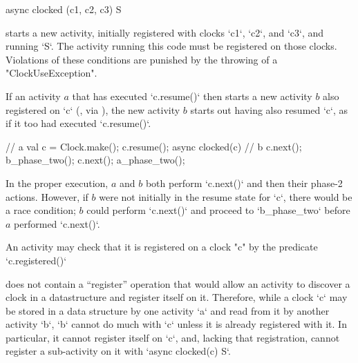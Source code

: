 \begin{xten}
  async clocked (c1, c2, c3) S
\end{xten}
starts a new activity, initially registered with
clocks \xcd`c1`, \xcd`c2`, and \xcd`c3`, and  running \xcd`S`. The activity running this code must
be registered on those clocks. 
Violations of these conditions are punished by the throwing of a
\xcd"ClockUseException". 


If an activity {$a$} that has executed \xcd`c.resume()` then starts a
new activity {$b$} also registered on \xcd`c` (\eg, via ), the new activity {$b$} starts out having also resumed
\xcd`c`, as if it too had executed \xcd`c.resume()`.  
\begin{xten}
// a
val c = Clock.make();
c.resume();
async clocked(c) {
  // b
  c.next();
  b_phase_two();
}
c.next();
a_phase_two();
\end{xten}
In the proper execution, {$a$} and {$b$} both perform
\xcd`c.next()` and then their phase-2 actions.  
However, if {$b$} were not
initially in the resume state for \xcd`c`, there would be a race condition;
{$b$} could perform \xcd`c.next()` and proceed to \xcd`b_phase_two`
before {$a$} performed \xcd`c.next()`.


An activity may check that it is registered on a clock \xcd"c" by
the predicate \xcd`c.registered()`


\begin{note}
\Xten{} does not contain a ``register'' operation that would allow an activity
to discover a clock in a datastructure and register itself on it. Therefore,
while a clock \xcd`c` may be stored in a data structure by one activity
\xcd`a` and read from it by another activity \xcd`b`, \xcd`b` cannot do much
with \xcd`c` unless it is already registered with it.  In particular, it
cannot register itself on \xcd`c`, and, lacking that registration, cannot
register a sub-activity on it with \xcd`async clocked(c) S`.
\end{note}


